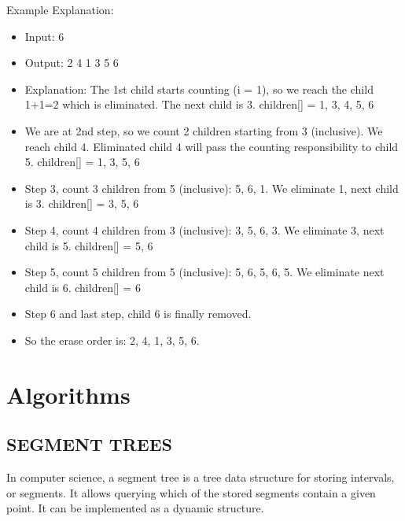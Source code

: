 \documentclass{article}
\begin{document}
Example Explanation:
\begin{itemize}
    \item Input:  6  
    \item Output:  2  4  1  3  5  6  
    \item Explanation:  The  1st  child  starts  counting  (i  =  1),  so  we  reach  the  child  1+1=2  which  is  eliminated.  The  next  child  is  3.  children[]  =  {1,  3,  4,  5,  6}
    \item We  are  at  2nd  step,  so  we  count  2  children  starting  from  3  (inclusive).  We  reach  child  4.  Eliminated  child  4  will  pass  the  counting  responsibility  to  child  5.  children[]  =  {1,  3,  5,  6}
    \item Step  3,  count  3  children  from  5  (inclusive):  5,  6,  1.  We  eliminate  1,  next  child  is  3.  children[]  =  {3,  5,  6}
    \item Step  4,  count  4  children  from  3  (inclusive):  3,  5,  6,  3.  We  eliminate  3,  next  child  is  5.  children[]  =  {5,  6}
    \item Step  5,  count  5  children  from  5  (inclusive):  5,  6,  5,  6,  5.  We  eliminate  next  child  is  6.  children[]  =  {6}
    \item Step  6  and  last  step,  child  6  is  finally  removed.  
    \item So  the  erase  order  is:  2,  4,  1,  3,  5,  6.
\end{itemize}


\section{Algorithms} 
\subsection{SEGMENT TREES}
In computer science, a segment tree is a tree data structure for storing intervals, or segments. It allows querying which of the stored segments contain a given point. It can be implemented as a dynamic structure.\\
\end{document}
